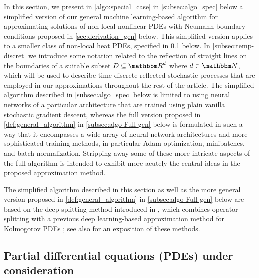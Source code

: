 In this section, we present in \cref{algo:special_case} in \cref{subsec:algo_spec} below a simplified version of our general machine learning-based algorithm for approximating solutions of non-local nonlinear PDEs with Neumann boundary conditions proposed in \cref{sec:derivation_gen} below. This simplified version applies to a smaller class of non-local heat PDEs, specified in \cref{subsec:pde_spec} below. In \cref{subsec:temp-discret} we introduce some notation related to the reflection of straight lines on the boundaries of a suitable subset $D\subseteq\R^d$ where $d\in\N$, which will be used to describe time-discrete reflected stochastic processes that are employed in our approximations throughout the rest of the article. The simplified algorithm described in \cref{subsec:algo_spec} below is limited to using neural networks of a particular architecture that are trained using plain vanilla stochastic gradient descent, whereas the full version proposed in \cref{def:general_algorithm} in \cref{subsec:algo-Full-gen} below is formulated in such a way that it encompasses a wide array of neural network architectures and more sophisticated training methods, in particular Adam optimization, minibatches, and batch normalization. Stripping away some of these more intricate aspects of the full algorithm is intended to exhibit more acutely the central ideas in the proposed approximation method.

The simplified algorithm described in this section as well as the more general version proposed in \cref{def:general_algorithm} in \cref{subsec:algo-Full-gen} below are based on the deep splitting method introduced in \cite{Beck2019}, which combines operator splitting with a previous deep learning-based approximation method for Kolmogorov PDEs \citep{beck2018solving}; see also \cite[Sections~2 and~3]{Beck2020} for an exposition of these methods.

\subsection{Partial differential equations (PDEs) under consideration}
\label{subsec:pde_spec}

